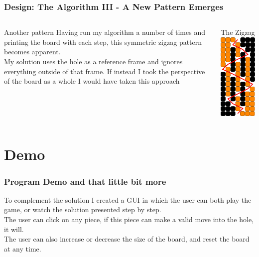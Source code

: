 \documentclass{beamer}
\begin{document}
	\begin{frame}
		\frametitle{Design: The Algorithm III - A New Pattern Emerges}	
		\begin{columns}[T]
			\begin{column}{.5\textwidth}
				\begin{block}{Another pattern}
				Having run my algorithm a number of times and printing the board with each step, 
				this symmetric zigzag pattern becomes apparent. \\\medskip
				My solution uses the hole as a reference frame and ignores everything outside
				of that frame. If instead I took the perspective of the board as a whole I would 
				have taken this approach
				\end{block}
			\end{column}
			
			\begin{column}{.5\textwidth}
				\begin{block}{The Zigzag}
				\includegraphics[width=3cm]{pegboardsolved}
				
				\end{block}
			\end{column}
		\end{columns}
	\end{frame}

\section{Demo}
	\begin{frame}
		\frametitle{Program Demo and that little bit more}
		To complement the solution I created a GUI in which the user can both play the game, or 
		watch the solution presented step by step. \\
		\vfill
		The user can click on any piece, if this piece can make a valid move into the hole, it will. \\
		\vfill
		The user can also increase or decrease the size of the board, and reset the board at any time. 
		
	\end{frame}
\end{document}
